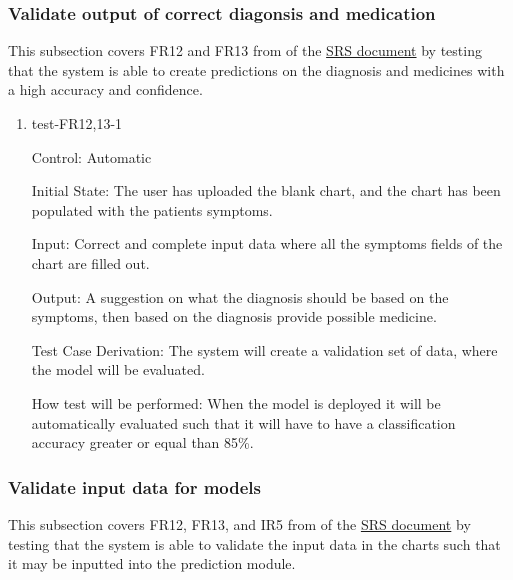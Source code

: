 \documentclass[12pt, titlepage]{article}
\begin{document}
\subsubsection{Validate output of correct diagonsis and medication} \label{section:4.1.6}

This subsection covers FR12 and FR13 from of the \href{https://github.com/Inreet-Kaur/capstone/blob/main/docs/SRS/SRS.pdf} {SRS document} by testing that the system is able to create predictions on the diagnosis and medicines with a high accuracy and confidence.

\begin{enumerate}

\item{test-FR12,13-1} \label{test-FR12,13-1}

Control: Automatic

Initial State: The user has uploaded the blank chart, and the chart has been populated with the patients symptoms.

Input: Correct and complete input data where all the symptoms fields of the chart are filled out.

Output: A suggestion on what the diagnosis should be based on the symptoms, then based on the diagnosis provide possible medicine.

Test Case Derivation: The system will create a validation set of data, where the model will be evaluated. 

How test will be performed: When the model is deployed it will be automatically evaluated such that it will have to have a classification accuracy greater or equal than 85\%.

\end{enumerate}


\subsubsection{Validate input data for models} \label{section:4.1.7}
This subsection covers FR12, FR13, and IR5 from of the \href{https://github.com/Inreet-Kaur/capstone/blob/main/docs/SRS/SRS.pdf} {SRS document} by testing that the system is able to validate the input data in the charts such that it may be inputted into the prediction module.
\end{document}
